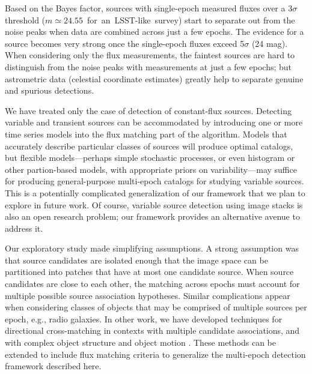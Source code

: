\documentclass[twocolumn]{emulateapj}
\newcommand\enote[1]{ {\color{red}%
\marginpar[\raggedleft\large $\blacktriangleright$]%
{\raggedright\large $\blacktriangleleft$} %
{\large $\langle\langle\langle$}{\sl #1}{\large  $\rangle\rangle\rangle$} }}
\begin{document}
Based on the Bayes factor, sources with single-epoch measured fluxes over a \mbox{3$\sigma$} threshold \mbox{($m\!\simeq\!24.55$ for an LSST-like survey)} start to separate out from the noise peaks when data are combined across just a few epochs.
The evidence for a source becomes very strong once the single-epoch fluxes exceed \mbox{5$\sigma$} (24 mag).
%
When considering only the flux measurements, the faintest sources are hard to distinguish from the noise peaks with measurements at just a few epochs; but astrometric data (celestial coordinate estimates) greatly help to separate genuine and spurious detections.

\iffalse
In general, the specificity and the selectivity of the proposed discriminator depends on a number of parameters, most of which we discuss as part of the simulated case study.
The pixel size, the single-epoch detection threshold, the number of exposures, and the point-spread function all affect the frequency of noise peaks.
The population distribution of source properties also directly impacts detectability of faint sources.
A hierarchical generalization of the approach could learn important features of the population distribution as part of the analysis. 
\enote{Not clear what this is getting at, in the previous revision:  ``as well as the statistics of the real sources based on which one can come up with reliable thresholds for progressively weeding out noise from the catalogs throughout the lifetime of a survey.''}
\fi



We have treated only the case of detection of constant-flux sources.
Detecting variable and transient sources can be accommodated by introducing one or more time series models into the flux matching part of the algorithm.
Models that accurately describe particular classes of sources will produce optimal catalogs, but flexible models---perhaps simple stochastic processes, or even histogram or other partion-based models, with appropriate priors on variability---may suffice for producing general-purpose multi-epoch catalogs for studying variable sources.
This is a potentially complicated generalization of our framework that we plan to explore in future work.
Of course, variable source detection using image stacks is also an open research problem; our framework provides an alternative avenue to address it.

Our exploratory study made simplifying assumptions.
A strong assumption was that source candidates are isolated enough that the image space can be partitioned into patches that have at most one candidate source.
When source candidates are close to each other, the matching across epochs must account for multiple possible source association hypotheses.
Similar complications appear when considering classes of objects that may be comprised of multiple sources per epoch, e.g., radio galaxies.
In other work, we have developed techniques for directional cross-matching in contexts with multiple candidate associations, and with complex object structure and object motion \citep{BL15-ARSA}.
These methods can be extended to include flux matching criteria to generalize the multi-epoch detection framework described here.
\end{document}
